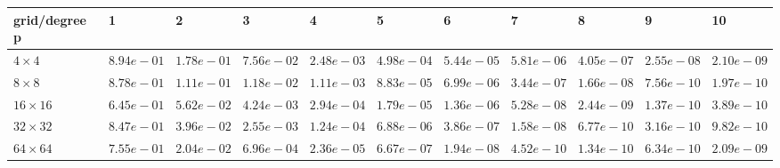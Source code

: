 \begin{tabular}{lllllllllll}
\hline
 grid/degree p   & 1          & 2          & 3          & 4          & 5          & 6          & 7          & 8          & 9          & 10         \\
\hline
 $4 \times 4$    & $8.94e-01$ & $1.78e-01$ & $7.56e-02$ & $2.48e-03$ & $4.98e-04$ & $5.44e-05$ & $5.81e-06$ & $4.05e-07$ & $2.55e-08$ & $2.10e-09$ \\
 $8 \times 8$    & $8.78e-01$ & $1.11e-01$ & $1.18e-02$ & $1.11e-03$ & $8.83e-05$ & $6.99e-06$ & $3.44e-07$ & $1.66e-08$ & $7.56e-10$ & $1.97e-10$ \\
 $16 \times 16$  & $6.45e-01$ & $5.62e-02$ & $4.24e-03$ & $2.94e-04$ & $1.79e-05$ & $1.36e-06$ & $5.28e-08$ & $2.44e-09$ & $1.37e-10$ & $3.89e-10$ \\
 $32 \times 32$  & $8.47e-01$ & $3.96e-02$ & $2.55e-03$ & $1.24e-04$ & $6.88e-06$ & $3.86e-07$ & $1.58e-08$ & $6.77e-10$ & $3.16e-10$ & $9.82e-10$ \\
 $64 \times 64$  & $7.55e-01$ & $2.04e-02$ & $6.96e-04$ & $2.36e-05$ & $6.67e-07$ & $1.94e-08$ & $4.52e-10$ & $1.34e-10$ & $6.34e-10$ & $2.09e-09$ \\
\hline
\end{tabular}